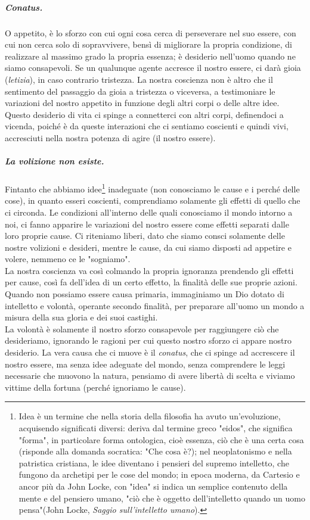 \subparagraph{Conatus.} O appetito, è lo sforzo con cui ogni cosa cerca di perseverare nel suo essere, con cui non cerca solo di sopravvivere, bensì di migliorare la propria condizione, di realizzare al massimo grado la propria essenza; è desiderio nell'uomo quando ne siamo consapevoli. Se un qualunque agente accresce il nostro essere, ci darà gioia (\textit{letizia}), in caso contrario tristezza. La nostra coscienza non è altro che il sentimento del passaggio da gioia a tristezza o viceversa, a testimoniare le variazioni del nostro appetito in funzione degli altri corpi o delle altre idee.\\
Questo desiderio di vita ci spinge a connetterci con altri corpi, definendoci a vicenda, poiché è da queste interazioni che ci sentiamo coscienti e quindi vivi, accresciuti nella nostra potenza di agire (il nostro essere).
\subparagraph{La volizione non esiste.} Fintanto che abbiamo idee\footnote{Idea è un termine che nella storia della filosofia ha avuto un'evoluzione, acquisendo significati diversi: deriva dal termine greco "eidos", che significa "forma", in particolare forma ontologica, cioè essenza, ciò che è una certa cosa (risponde alla domanda socratica: "Che cosa è?); nel neoplatonismo e nella patristica cristiana, le idee diventano i pensieri del supremo intelletto, che fungono da archetipi per le cose del mondo; in epoca moderna, da Cartesio e ancor più da John Locke, con "idea" si indica un semplice contenuto della mente e del pensiero umano, "ciò che è oggetto dell'intelletto quando un uomo pensa"(John Locke, \textit{Saggio sull'intelletto umano}).} inadeguate (non conosciamo le cause e i perché delle cose), in quanto esseri coscienti, comprendiamo solamente gli effetti di quello che ci circonda. Le condizioni all'interno delle quali conosciamo il mondo intorno a noi, ci fanno apparire le variazioni del nostro essere come effetti separati dalle loro proprie cause. Ci riteniamo liberi, dato che siamo consci solamente delle nostre volizioni e desideri, mentre le cause, da cui siamo disposti ad appetire e volere, nemmeno ce le "sogniamo".\\
La nostra coscienza va così colmando la propria ignoranza prendendo gli effetti per cause, così fa dell'idea di un certo effetto, la finalità delle sue proprie azioni. Quando non possiamo essere causa primaria, immaginiamo un Dio dotato di intelletto e volontà, operante secondo finalità, per preparare all'uomo un mondo a misura della sua gloria e dei suoi castighi.\\
La volontà è solamente il nostro sforzo consapevole per raggiungere ciò che desideriamo, ignorando le ragioni per cui questo nostro sforzo ci appare nostro desiderio. La vera causa che ci muove è il \textit{conatus}, che ci spinge ad accrescere il nostro essere, ma senza idee adeguate del mondo, senza comprendere le leggi necessarie che muovono la natura, pensiamo di avere libertà di scelta e viviamo vittime della fortuna (perché ignoriamo le cause).
